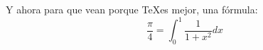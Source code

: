 \documentclass {article}
\begin{document}
 
	Y ahora para que vean porque \TeX es mejor, una fórmula: 
	$$ \frac{\pi}{4} = \int_0^1 \frac{1}{1+x^2} dx $$ 
\end{document}
